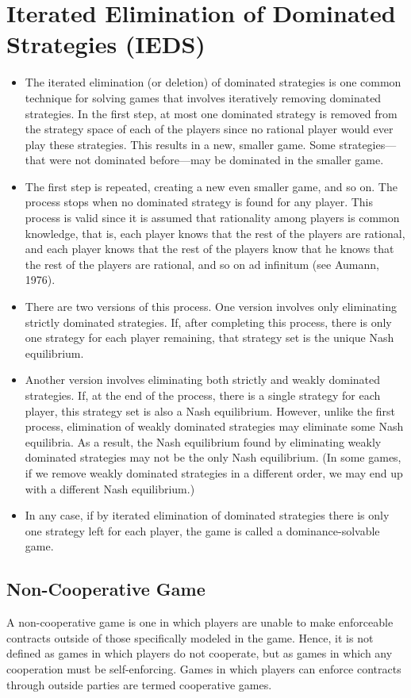 \documentclass[]{report}
\begin{document}
\section{Iterated Elimination of Dominated Strategies (IEDS) }
\begin{itemize}
\item The iterated elimination (or deletion) of dominated strategies is one common technique for solving games that involves iteratively removing dominated strategies. In the first step, at most one dominated strategy is removed from the strategy space of each of the players since no rational player would ever play these strategies. This results in a new, smaller game. Some strategies—that were not dominated before—may be dominated in the smaller game. 
\item 
The first step is repeated, creating a new even smaller game, and so on. The process stops when no dominated strategy is found for any player. This process is valid since it is assumed that rationality among players is common knowledge, that is, each player knows that the rest of the players are rational, and each player knows that the rest of the players know that he knows that the rest of the players are rational, and so on ad infinitum (see Aumann, 1976).
\item 
There are two versions of this process. One version involves only eliminating strictly dominated strategies. If, after completing this process, there is only one strategy for each player remaining, that strategy set is the unique Nash equilibrium.
\item
Another version involves eliminating both strictly and weakly dominated strategies. If, at the end of the process, there is a single strategy for each player, this strategy set is also a Nash equilibrium. However, unlike the first process, elimination of weakly dominated strategies may eliminate some Nash equilibria. As a result, the Nash equilibrium found by eliminating weakly dominated strategies may not be the only Nash equilibrium. (In some games, if we remove weakly dominated strategies in a different order, we may end up with a different Nash equilibrium.)
\item 
In any case, if by iterated elimination of dominated strategies there is only one strategy left for each player, the game is called a dominance-solvable game.
\end{itemize}
\newpage
\subsection{Non-Cooperative Game}
A non-cooperative game is one in which players are unable to make enforceable contracts outside of those specifically modeled in the game. Hence, it is not defined as games in which players do not cooperate, but as games in which any cooperation must be self-enforcing. Games in which players can enforce contracts through outside parties are termed cooperative games.
\end{document}

